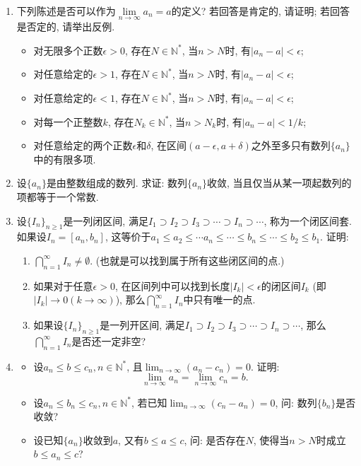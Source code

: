 \documentclass[UTF8,11pt, a4paper, oneside, fontset=none]{ctexbook}
\begin{document}
\begin{enumerate}
\begin{enumerate}
\item 下列陈述是否可以作为$\lim\limits_{n \to \infty} a_n = a$的定义? 若回答是肯定的, 请证明; 若回答是否定的, 请举出反例.

\begin{itemize}
\item[(1)] 对无限多个正数$\epsilon>0$, 存在$N \in \mathbb N^*$, 当$n >N$时, 有$|a_n - a|< \epsilon$;
\item[(2)] 对任意给定的$\epsilon >1$, 存在$N \in \mathbb N^*$, 当$n >N$时, 有$|a_n - a|< \epsilon$;
\item[(3)] 对任意给定的$\epsilon <1$, 存在$N \in \mathbb N^*$, 当$n >N$时, 有$|a_n - a|< \epsilon$;
\item[(4)] 对每一个正整数$k$, 存在$N_k \in \mathbb N^*$, 当$n >N_k$时, 有$|a_n - a|< 1/k$;
\item[(5)] 对任意给定的两个正数$\epsilon$和$\delta$, 在区间$(a-\epsilon, a+\delta)$之外至多只有数列$\{ a_n \}$中的有限多项.
\end{itemize}

\item 设$\{ a_n \}$是由整数组成的数列. 求证: 数列$\{ a_n \}$收敛, 当且仅当从某一项起数列的项都等于一个常数.

\item 设$\{ I_n \}_{n \geq 1}$是一列闭区间, 满足$I_1 \supset I_2 \supset I_3 \supset \cdots \supset I_n \supset \cdots$, 称为一个闭区间套. 如果设$I_n = [a_n, b_n]$, 这等价于$a_1 \leq a_2 \leq \cdots a_n \leq \cdots \leq b_n \leq \cdots \leq b_2 \leq b_1$. 证明:

\begin{enumerate}
\item $\bigcap_{n=1}^{\infty} I_n \neq \emptyset$. (也就是可以找到属于所有这些闭区间的点.)
\item 如果对于任意$\epsilon >0$, 在区间列中可以找到长度$|I_k| < \epsilon$的闭区间$I_k$ (即$|I_k| \to 0 (k \to \infty)$), 那么$\bigcap_{n=1}^{\infty} I_n$中只有唯一的点.
\item 如果设$\{ I_n \}_{n \geq 1}$是一列开区间, 满足$I_1 \supset I_2 \supset I_3 \supset \cdots \supset I_n \supset \cdots$, 那么$\bigcap_{n=1}^{\infty} I_n $是否还一定非空?
\end{enumerate}

\item
\begin{itemize}
\item[(1)] 设$a_n \leq b \leq c_n, n \in \mathbb N^*$, 且$\lim_{n \to \infty} (a_n - c_n) =0$. 证明:
\[
\lim_{n \to \infty} a_n = \lim_{n \to \infty} c_n = b.
\]
\item[(2)] 设$a_n \leq b_n \leq c_n, n \in \mathbb N^*$, 若已知$\lim_{n \to \infty}(c_n -a_n) =0$, 问: 数列$\{b_n\}$是否收敛?
\item[(3)] 设已知$\{a_n\}$收敛到$a$, 又有$b \leq a \leq c$, 问: 是否存在$N$, 使得当$n >N$时成立$b \leq a_n \leq c$?
\end{itemize}
\end{enumerate}


\end{enumerate}
\end{document}
